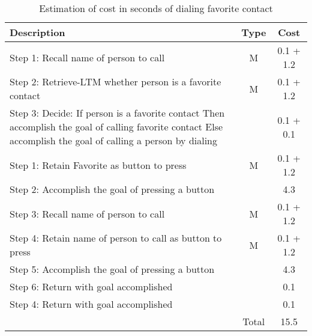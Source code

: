 \begin{enumerate}
\begin{table}
\centering
\begin{tabularx}{\textwidth}{@{} Y c c @{}}
\toprule
Description & Type & Cost\\
\midrule
Step 1: Recall name of person to call & M & 0.1 + 1.2 \\
Step 2: Retrieve-LTM whether person is a favorite contact & M & 0.1 + 1.2 \\
Step 3: Decide: If person is a favorite contact Then accomplish the goal of calling favorite contact Else accomplish the goal of calling a person by dialing & & 0.1 + 0.1\\
\quad Step 1: Retain Favorite as button to press & M & 0.1 + 1.2\\
\quad Step 2: Accomplish the goal of pressing a button & & 4.3\\
\quad Step 3: Recall name of person to call & M & 0.1 + 1.2\\
\quad Step 4: Retain name of person to call as button to press & M & 0.1 + 1.2\\
\quad Step 5: Accomplish the goal of pressing a button & & 4.3\\
\quad Step 6: Return with goal accomplished & & 0.1\\
Step 4: Return with goal accomplished & & 0.1\\
\midrule
& Total & 15.5\\
\bottomrule
\end{tabularx}
\caption{Estimation of cost in seconds of dialing favorite contact}
\label{table:favorite}
\end{table}

\end{enumerate}



